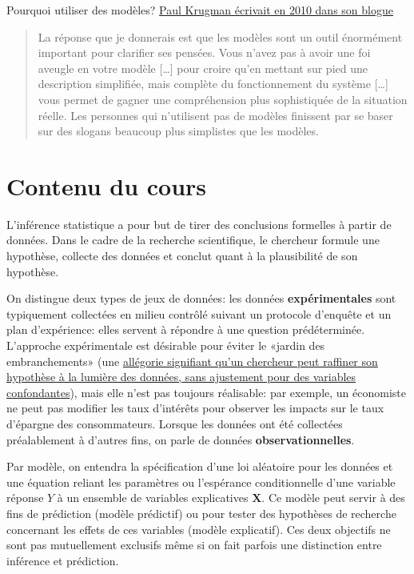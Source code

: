 \documentclass[
  11pt,
  letterpaper,
]{scrbook}
\theoremstyle{plain}
\theoremstyle{plain}
\theoremstyle{definition}
\theoremstyle{definition}
\theoremstyle{remark}
\begin{document}
Pourquoi utiliser des modèles?
\href{https://krugman.blogs.nytimes.com/2010/11/18/debt-deleveraging-and-the-liquidity-trap/}{Paul
Krugman écrivait en 2010 dans son blogue}

\begin{quote}
La réponse que je donnerais est que les modèles sont un outil énormément
important pour clarifier ses pensées. Vous n'avez pas à avoir une foi
aveugle en votre modèle {[}\ldots{]} pour croire qu'en mettant sur pied
une description simplifiée, mais complète du fonctionnement du système
{[}\ldots{]} vous permet de gagner une compréhension plus sophistiquée
de la situation réelle. Les personnes qui n'utilisent pas de modèles
finissent par se baser sur des slogans beaucoup plus simplistes que les
modèles.
\end{quote}

\section*{Contenu du cours}\label{contenu-du-cours}


L'inférence statistique a pour but de tirer des conclusions formelles à
partir de données. Dans le cadre de la recherche scientifique, le
chercheur formule une hypothèse, collecte des données et conclut quant à
la plausibilité de son hypothèse.

On distingue deux types de jeux de données: les données
\textbf{expérimentales} sont typiquement collectées en milieu contrôlé
suivant un protocole d'enquête et un plan d'expérience: elles servent à
répondre à une question prédéterminée. L'approche expérimentale est
désirable pour éviter le «jardin des embranchements» (une
\href{http://www.stat.columbia.edu/~gelman/research/unpublished/p_hacking.pdf}{allégorie
signifiant qu'un chercheur peut raffiner son hypothèse à la lumière des
données, sans ajustement pour des variables confondantes}), mais elle
n'est pas toujours réalisable: par exemple, un économiste ne peut pas
modifier les taux d'intérêts pour observer les impacts sur le taux
d'épargne des consommateurs. Lorsque les données ont été collectées
préalablement à d'autres fins, on parle de données
\textbf{observationnelles}.

Par modèle, on entendra la spécification d'une loi aléatoire pour les
données et une équation reliant les paramètres ou l'espérance
conditionnelle d'une variable réponse \(Y\) à un ensemble de variables
explicatives \(\mathbf{X}.\) Ce modèle peut servir à des fins de
prédiction (modèle prédictif) ou pour tester des hypothèses de recherche
concernant les effets de ces variables (modèle explicatif). Ces deux
objectifs ne sont pas mutuellement exclusifs même si on fait parfois une
distinction entre inférence et prédiction.
\end{document}
